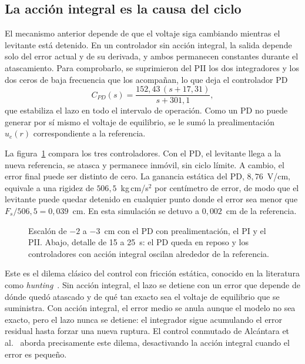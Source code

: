 \subsection{La acción integral es la causa del ciclo}

El mecanismo anterior depende de que el voltaje siga cambiando mientras el levitante está detenido. En un controlador sin acción integral, la salida depende solo del error actual y de su derivada, y ambos permanecen constantes durante el atascamiento. Para comprobarlo, se suprimieron del PII los dos integradores y los dos ceros de baja frecuencia que los acompañan, lo que deja el controlador PD
\begin{equation}
C_{PD}(s) = \frac{152{,}43\,(s+17{,}31)}{s+301{,}1} ,
\label{eq:pd}
\end{equation}
que estabiliza el lazo en todo el intervalo de operación. Como un PD no puede generar por sí mismo el voltaje de equilibrio, se le sumó la prealimentación $u_e(r)$ correspondiente a la referencia.

La figura~\ref{fig:pd_pi_pii} compara los tres controladores. Con el PD, el levitante llega a la nueva referencia, se atasca y permanece inmóvil, sin ciclo límite. A cambio, el error final puede ser distinto de cero. La ganancia estática del PD, $8{,}76$~V/cm, equivale a una rigidez de $506{,}5$~kg\,cm/s$^2$ por centímetro de error, de modo que el levitante puede quedar detenido en cualquier punto donde el error sea menor que $F_s/506{,}5 = 0{,}039$~cm. En esta simulación se detuvo a $0{,}002$~cm de la referencia.

\begin{figure}[ht]
    \centering
    
    \caption[PD, PI y PII con atascamiento-deslizamiento]{Escalón de $-2$ a $-3$~cm con el PD con prealimentación, el PI y el PII. Abajo, detalle de 15 a 25~s: el PD queda en reposo y los controladores con acción integral oscilan alrededor de la referencia.}
    \label{fig:pd_pi_pii}
\end{figure}

Este es el dilema clásico del control con fricción estática, conocido en la literatura como \emph{hunting}~\cite{olsson}. Sin acción integral, el lazo se detiene con un error que depende de dónde quedó atascado y de qué tan exacto sea el voltaje de equilibrio que se suministra. Con acción integral, el error medio se anula aunque el modelo no sea exacto, pero el lazo nunca se detiene: el integrador sigue acumulando el error residual hasta forzar una nueva ruptura. El control conmutado de Alcántara et al.~\cite{alcantara} aborda precisamente este dilema, desactivando la acción integral cuando el error es pequeño.

